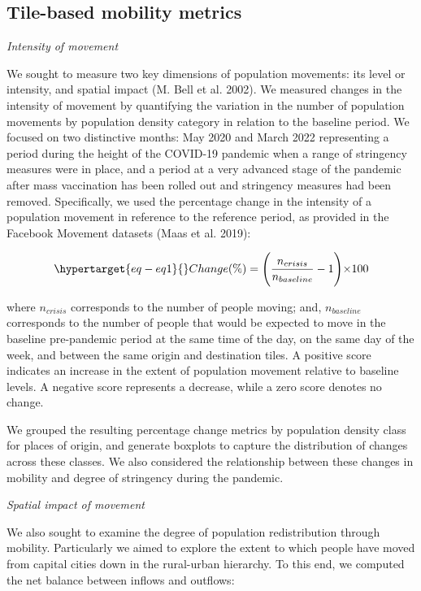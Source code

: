 \documentclass[
  11pt,
]{article}
\begin{document}
\hypertarget{tile-based-mobility-metrics}{%
\subsection{Tile-based mobility
metrics}\label{tile-based-mobility-metrics}}

\emph{Intensity of movement}

We sought to measure two key dimensions of population movements: its
level or intensity, and spatial impact (M. Bell et al. 2002). We
measured changes in the intensity of movement by quantifying the
variation in the number of population movements by population density
category in relation to the baseline period. We focused on two
distinctive months: May 2020 and March 2022 representing a period during
the height of the COVID-19 pandemic when a range of stringency measures
were in place, and a period at a very advanced stage of the pandemic
after mass vaccination has been rolled out and stringency measures had
been removed. Specifically, we used the percentage change in the
intensity of a population movement in reference to the reference period,
as provided in the Facebook Movement datasets (Maas et al. 2019):

\begin{equation}\protect\hypertarget{eq-eq1}{}{
Change (\%) = \Biggl( \frac{n_{crisis}}{n_{baseline}}-1 \Biggl) \times 100
}\label{eq-eq1}\end{equation}

where \(n_{crisis}\) corresponds to the number of people moving; and,
\(n_{baseline}\) corresponds to the number of people that would be
expected to move in the baseline pre-pandemic period at the same time of
the day, on the same day of the week, and between the same origin and
destination tiles. A positive score indicates an increase in the extent
of population movement relative to baseline levels. A negative score
represents a decrease, while a zero score denotes no change.

We grouped the resulting percentage change metrics by population density
class for places of origin, and generate boxplots to capture the
distribution of changes across these classes. We also considered the
relationship between these changes in mobility and degree of stringency
during the pandemic.

\emph{Spatial impact of movement}

We also sought to examine the degree of population redistribution
through mobility. Particularly we aimed to explore the extent to which
people have moved from capital cities down in the rural-urban hierarchy.
To this end, we computed the net balance between inflows and outflows:
\end{document}
